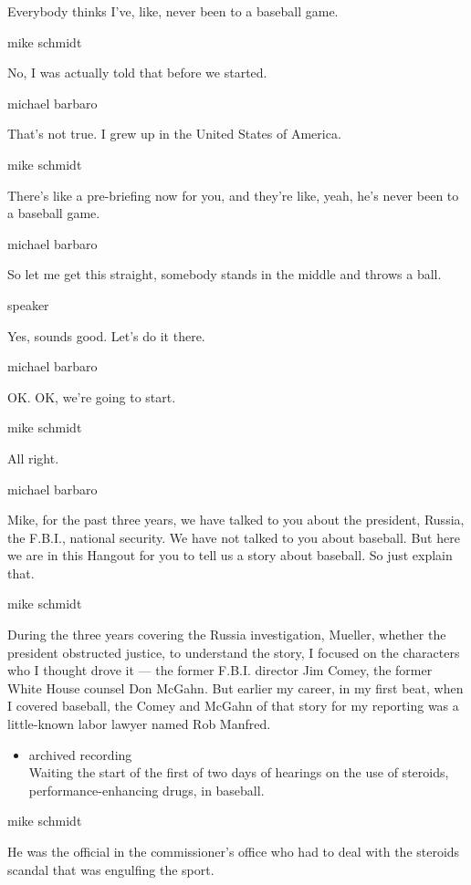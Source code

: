 Everybody thinks I've, like, never been to a baseball game.

mike schmidt

No, I was actually told that before we started.

michael barbaro

That's not true. I grew up in the United States of America.

mike schmidt

There's like a pre-briefing now for you, and they're like, yeah, he's
never been to a baseball game.

michael barbaro

So let me get this straight, somebody stands in the middle and throws a
ball.

speaker

Yes, sounds good. Let's do it there.

michael barbaro

OK. OK, we're going to start.

mike schmidt

All right.

michael barbaro

Mike, for the past three years, we have talked to you about the
president, Russia, the F.B.I., national security. We have not talked to
you about baseball. But here we are in this Hangout for you to tell us a
story about baseball. So just explain that.

mike schmidt

During the three years covering the Russia investigation, Mueller,
whether the president obstructed justice, to understand the story, I
focused on the characters who I thought drove it --- the former F.B.I.
director Jim Comey, the former White House counsel Don McGahn. But
earlier my career, in my first beat, when I covered baseball, the Comey
and McGahn of that story for my reporting was a little-known labor
lawyer named Rob Manfred.

\begin{itemize}
\tightlist
\item
  archived recording\\
  Waiting the start of the first of two days of hearings on the use of
  steroids, performance-enhancing drugs, in baseball.
\end{itemize}

mike schmidt

He was the official in the commissioner's office who had to deal with
the steroids scandal that was engulfing the sport.

